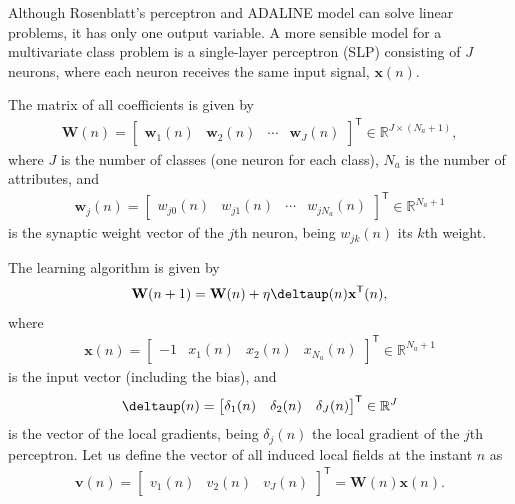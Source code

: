 \documentclass[12pt,a4paper]{article}
\newcommand{\trans}{\mathsf{T}}
\newcommand{\Real}{\mathbb{R}}
\begin{document}
Although Rosenblatt's perceptron and ADALINE model can solve linear problems, it has only one output variable. A more sensible model for a multivariate class problem is a single-layer perceptron (SLP) consisting of \(J\) neurons, where each neuron receives the same input signal, \(\mathbf{x}(n)\).

The matrix of all coefficients is given by
\begin{align}
    \mathbf{W}(n) = \begin{bmatrix}
        \mathbf{w}_1 (n) & \mathbf{w}_2 (n) & \cdots & \mathbf{w}_J (n)
    \end{bmatrix}^\trans \in \Real^{J \times \left(N_a+1\right)},
\end{align}
where \(J\) is the number of classes (one neuron for each class), \(N_a\) is the number of attributes, and
\begin{align}
    \mathbf{w}_j (n) = \begin{bmatrix}
        w_{j0} (n) & w_{j1} (n) & \cdots & w_{j N_a} (n)
    \end{bmatrix}^\trans \in \Real^{N_a+1}
\end{align}
is the synaptic weight vector of the \(j\)th neuron, being \(w_{jk} (n)\) its \(k\)th weight.

The learning algorithm is given by
\begin{align}
    \mathbf{W}(n+1) = \mathbf{W}(n) + \eta \boldsymbol{\deltaup}(n) \mathbf{x}^\trans(n),
\end{align}
where
\begin{align}
    \mathbf{x}(n) = \begin{bmatrix}
        -1 & x_1(n) & x_2(n) & x_{N_a}(n)
    \end{bmatrix}^\trans \in \Real^{N_a+1}
\end{align}
is the input vector (including the bias), and
\begin{align}
    \boldsymbol{\deltaup}(n) = \begin{bmatrix}
        \delta_1(n) & \delta_2(n) & \delta_J(n)
    \end{bmatrix}^\trans \in \Real^{J}
\end{align}
is the vector of the local gradients, being \(\delta_j(n)\) the local gradient of the \(j\)th perceptron. Let us define the vector of all induced local fields at the instant \(n\) as
\begin{align}
    \mathbf{v}(n) = \begin{bmatrix}
        v_1(n) & v_2(n) & v_J(n)
    \end{bmatrix}^\trans = \mathbf{W}(n) \mathbf{x}(n).
\end{align}
\end{document}

